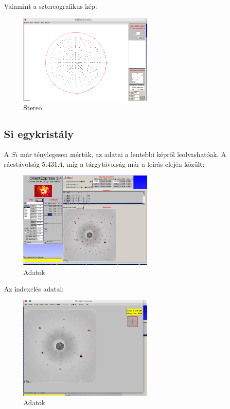 \documentclass[a4paper,12pt]{article}
\begin{document}
\par Valamint a sztereografikus kép:

\begin{figure}[H]
	\centering
	\includegraphics[width=0.6\textwidth]{NaCl-stereo.png}
	\caption{Stereo}
\end{figure}

\subsection{ Si egykristály}

\par A $Si$ már ténylegesen mértük, az adatai a lentebbi képről
leolvashatóak. A rácstávolság $5.431 A$, míg a tárgytávolság már a leírás
elején közült:

\begin{figure}[H]
	\centering
	\includegraphics[width=0.6\textwidth]{./valid_indexation/Si.png}
	\caption{Adatok}
\end{figure}

\par Az indexelés adatai:

\begin{figure}[H]
	\centering
	\includegraphics[width=0.6\textwidth]{./valid_indexation/Si-coords.png}
	\caption{Adatok}
\end{figure}
\end{document}
